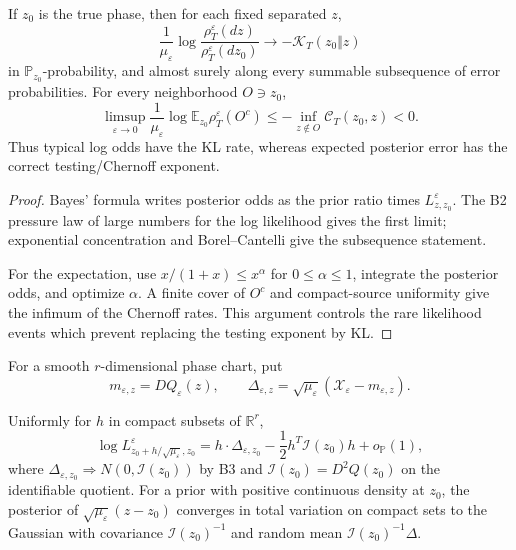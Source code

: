 \begin{theorem}
\label{thm:r3-c1-filter}
If \(z_0\) is the true phase, then for each fixed separated \(z\),
\[
 \frac1{\mu_\varepsilon}
 \log\frac{\rho_T^\varepsilon(dz)}
 {\rho_T^\varepsilon(dz_0)}
 \longrightarrow-\mathcal K_T(z_0\Vert z)
\]
in \(\mathbb P_{z_0}\)-probability, and almost surely along every summable
subsequence of error probabilities.  For every neighborhood \(O\ni z_0\),
\[
 \limsup_{\varepsilon\to0}
 \frac1{\mu_\varepsilon}
 \log\mathbb E_{z_0}\rho_T^\varepsilon(O^c)
 \le-\inf_{z\notin O}\mathcal C_T(z_0,z)<0.
\]
Thus typical log odds have the KL rate, whereas expected posterior error has
the correct testing/Chernoff exponent.
\end{theorem}

\begin{proof}
Bayes' formula writes posterior odds as the prior ratio times
\(L_{z,z_0}^\varepsilon\).  The B2 pressure law of large numbers for the log
likelihood gives the first limit; exponential concentration and
Borel--Cantelli give the subsequence statement.

For the expectation, use
\(x/(1+x)\le x^\alpha\) for \(0\le\alpha\le1\), integrate the posterior odds,
and optimize \(\alpha\).  A finite cover of \(O^c\) and compact-source
uniformity give the infimum of the Chernoff rates.  This argument controls the
rare likelihood events which prevent replacing the testing exponent by KL.
\end{proof}

For a smooth \(r\)-dimensional phase chart, put
\[
 m_{\varepsilon,z}=DQ_\varepsilon(z),
 \qquad
 \Delta_{\varepsilon,z}
 =\sqrt{\mu_\varepsilon}
 (\mathcal X_\varepsilon-m_{\varepsilon,z}).
\]

\begin{theorem}
\label{thm:r4-c1-lan}
Uniformly for \(h\) in compact subsets of \(\mathbb R^r\),
\[
 \log L_{z_0+h/\sqrt{\mu_\varepsilon},z_0}^\varepsilon
 =h\cdot\Delta_{\varepsilon,z_0}
 -\frac12h^T\mathcal I(z_0)h+o_{\mathbb P}(1),
\]
where \(\Delta_{\varepsilon,z_0}\Rightarrow
N(0,\mathcal I(z_0))\) by B3 and
\(\mathcal I(z_0)=D^2Q(z_0)\) on the identifiable quotient.  For a prior with
positive continuous density at \(z_0\), the posterior of
\(\sqrt{\mu_\varepsilon}(z-z_0)\) converges in total variation on compact
sets to the Gaussian with covariance \(\mathcal I(z_0)^{-1}\) and random mean
\(\mathcal I(z_0)^{-1}\Delta\).
\end{theorem}


